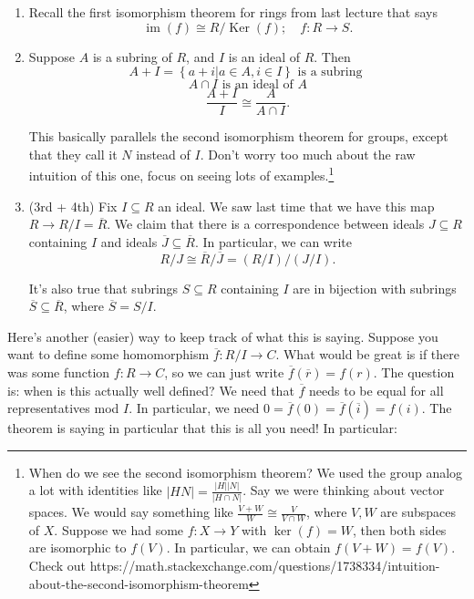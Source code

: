 \documentclass[12pt]{article}
\newcommand{\ol}{\overline}
\DeclareMathOperator{\Ker}{Ker}
\DeclareMathOperator{\im}{im}
\begin{document}
 \begin{enumerate}
   \item Recall the first isomorphism theorem for rings from last lecture that says
     \[
       \im(f) \cong R / \Ker(f); \quad f : R \to S.
       \]
     \item Suppose $A$ is a subring of $R$, and $I$ is an ideal of $R$.  Then
       \[
         A + I = \left\{ a + i | a \in A, i \in I \right\} \text{ is a subring }
         \]
         \[
           A \cap I \text{ is an ideal of } A
           \]
           \[
             \frac{A+I}{I} \cong \frac{A}{A \cap I}.
           \]

           This basically parallels the second isomorphism theorem for groups, except that they call it $N$ instead of $I$.  Don't worry too much about the raw intuition of this one, focus on seeing lots of examples.\footnote{When do we see the second isomorphism theorem?  We used the group analog a lot with identities like $|HN| = \frac{|H| |N|}{|H \cap N|}$.  Say we were thinking about vector spaces.  We would say something like $\frac{V+W}{W} \cong \frac{V}{V \cap W}$, where $V, W$ are subspaces of $X$.  Suppose we had some $f: X \to Y$ with $\ker(f) = W$, then both sides are isomorphic to $f(V)$.  In particular, we can obtain $f(V+W) = f(V)$.  Check out https://math.stackexchange.com/questions/1738334/intuition-about-the-second-isomorphism-theorem}

         \item (3rd + 4th) Fix $I \subseteq R$ an ideal.  We saw last time that we have this map $R \to R/I = \ol{R}$.  We claim that there is a correspondence between ideals $J \subseteq R$ containing $I$ and ideals $\ol{J} \subseteq \ol{R}$. In particular, we can write 
           \[
             R / J \cong \ol{R} / \ol{J} = (R/I) / (J/I).
           \]

           It's also true that subrings $S \subseteq R$ containing $I$ are in bijection with subrings $\ol{S} \subseteq \ol{R}$, where $\ol{S} = S / I$.
\end{enumerate}

Here's another (easier) way to keep track of what this is saying.  Suppose you want to define some homomorphism $\ol{f} : R / I \to C$.  What would be great is if there was some function $f: R \to C$, so we can just write $\ol{f}(\ol{r}) = f(r)$.  The question is: when is this actually well defined?  We need that $\ol{f}$ needs to be equal for all representatives mod $I$.  In particular, we need $0 = \ol{f}(0) = \ol{f}(\ol{i}) = f(i)$.  The theorem is saying in particular that this is all you need!  In particular:
\end{document}
